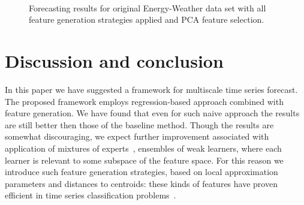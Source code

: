 \documentclass[conference]{IEEEtran}
\begin{document}
%
\begin{figure}
\centering
{}
\\
\\
\\

\caption{ Forecasting results for original Energy-Weather data set with all feature generation strategies applied and PCA feature selection.}\label{fg:pca_frc}
\end{figure}


\section{Discussion and conclusion}
In this paper we have suggested a framework for multiscale time series forecast. The proposed framework employs regression-based approach combined with feature generation. We have found that even for such naive approach the results are still better then those of the baseline method. Though the results are somewhat discouraging, we expect further improvement
associated with application of mixtures of experts~\cite{Yuksel2015}, ensembles of weak learners, where each learner is relevant to some subspace of the feature space. For this reason we introduce such feature generation strategies, based on local approximation parameters and distances to centroids: these kinds of features have proven efficient in time series classification problems~\cite{Ignatov2015}.


\nocite{*}

\end{document}
